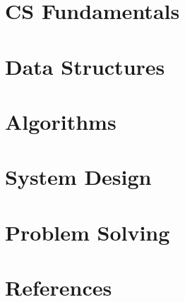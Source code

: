 \section[CS]{CS Fundamentals}
	
	
	
\section[DS]{Data Structures}
	
	
	
	
	
	
\section[Algos]{Algorithms}
		
	
	
	
	

\section[Sys]{System Design}

	
	

\section[Probs]{Problem Solving}
	


\section[Refs]{References}
	

